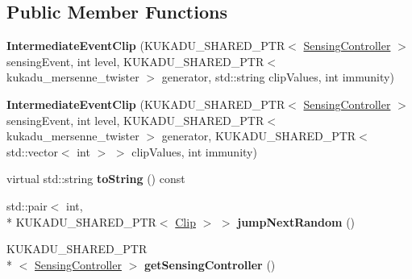 \subsection*{Public Member Functions}
\begin{DoxyCompactItemize}
\item 
\hypertarget{classkukadu_1_1IntermediateEventClip_a91279d5477030bfdd9adf95864fbff04}{{\bfseries Intermediate\-Event\-Clip} (K\-U\-K\-A\-D\-U\-\_\-\-S\-H\-A\-R\-E\-D\-\_\-\-P\-T\-R$<$ \hyperlink{classkukadu_1_1SensingController}{Sensing\-Controller} $>$ sensing\-Event, int level, K\-U\-K\-A\-D\-U\-\_\-\-S\-H\-A\-R\-E\-D\-\_\-\-P\-T\-R$<$ kukadu\-\_\-mersenne\-\_\-twister $>$ generator, std\-::string clip\-Values, int immunity)}\label{classkukadu_1_1IntermediateEventClip_a91279d5477030bfdd9adf95864fbff04}

\item 
\hypertarget{classkukadu_1_1IntermediateEventClip_a880dddcacad2b7cd26be43bdf62cd11a}{{\bfseries Intermediate\-Event\-Clip} (K\-U\-K\-A\-D\-U\-\_\-\-S\-H\-A\-R\-E\-D\-\_\-\-P\-T\-R$<$ \hyperlink{classkukadu_1_1SensingController}{Sensing\-Controller} $>$ sensing\-Event, int level, K\-U\-K\-A\-D\-U\-\_\-\-S\-H\-A\-R\-E\-D\-\_\-\-P\-T\-R$<$ kukadu\-\_\-mersenne\-\_\-twister $>$ generator, K\-U\-K\-A\-D\-U\-\_\-\-S\-H\-A\-R\-E\-D\-\_\-\-P\-T\-R$<$ std\-::vector$<$ int $>$ $>$ clip\-Values, int immunity)}\label{classkukadu_1_1IntermediateEventClip_a880dddcacad2b7cd26be43bdf62cd11a}

\item 
\hypertarget{classkukadu_1_1IntermediateEventClip_aa2aeb835bcd24ad8503ddebee554fbac}{virtual std\-::string {\bfseries to\-String} () const }\label{classkukadu_1_1IntermediateEventClip_aa2aeb835bcd24ad8503ddebee554fbac}

\item 
\hypertarget{classkukadu_1_1IntermediateEventClip_a471a55d04d08972093c618d383af1213}{std\-::pair$<$ int, \\*
K\-U\-K\-A\-D\-U\-\_\-\-S\-H\-A\-R\-E\-D\-\_\-\-P\-T\-R$<$ \hyperlink{classkukadu_1_1Clip}{Clip} $>$ $>$ {\bfseries jump\-Next\-Random} ()}\label{classkukadu_1_1IntermediateEventClip_a471a55d04d08972093c618d383af1213}

\item 
\hypertarget{classkukadu_1_1IntermediateEventClip_af486d261e5b163d86b5bfe87fd7a41a7}{K\-U\-K\-A\-D\-U\-\_\-\-S\-H\-A\-R\-E\-D\-\_\-\-P\-T\-R\\*
$<$ \hyperlink{classkukadu_1_1SensingController}{Sensing\-Controller} $>$ {\bfseries get\-Sensing\-Controller} ()}\label{classkukadu_1_1IntermediateEventClip_af486d261e5b163d86b5bfe87fd7a41a7}

\end{DoxyCompactItemize}
